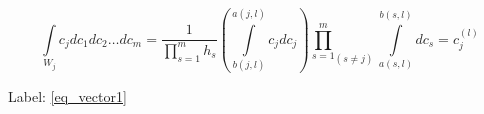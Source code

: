 \documentclass[11pt]{article}
\numberwithin{equation}{subsection}
\begin{document}
\begin{equation}
\int \limits_{W_j} c_{j}dc_{1}dc_{2} \ldots dc_{m} = \dfrac{1}{\prod\limits_{s=1}^{m}h_{s}}\left( \int\limits_{b(j,l)}^{a(j,l)} c_{j} dc_{j}\right) {\prod\limits_{s=1}^{m}}_{(s \neq j)} \int\limits_{a(s,l)}^{b(s,l)} dc_{s} = c_{j}^{(l)} \label{eq_vector1}
\end{equation}

Label: \eqref{eq_vector1}
\end{document}
